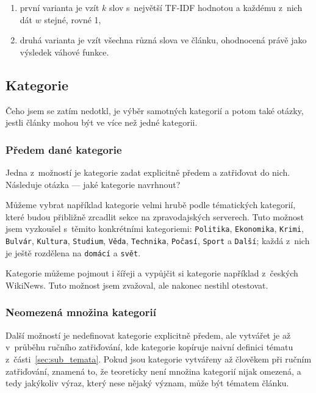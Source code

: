 \documentclass[12pt,a4paper]{report}
\begin{document}
\begin{enumerate}
    \item první varianta je vzít $k$ slov s~největší TF-IDF hodnotou a každému z~nich dát $w$ stejné, rovné 1,
    \item druhá varianta je vzít všechna různá slova ve článku, ohodnocená právě jako výsledek váhové funkce.
\end{enumerate}

\subsection{Kategorie}
\label{sec:jakekategorie}
Čeho jsem se zatím nedotkl, je výběr samotných kategorií a potom také otázky, jestli články mohou být ve více než jedné kategorii. %

\subsubsection{Předem dané kategorie}
\label{sec:omezene_teorie}

Jedna z~možností je kategorie zadat explicitně předem a zatřiďovat do nich. Následuje otázka --- jaké kategorie navrhnout?

Můžeme vybrat například kategorie velmi hrubě podle tématických kategorií, které budou přibližně zrcadlit sekce na zpravodajských serverech. Tuto možnost jsem vyzkoušel s~těmito konkrétními kategoriemi: \texttt{Politika}, \texttt{Ekonomika}, \texttt{Krimi}, \texttt{Bulvár}, \texttt{Kultura}, \texttt{Studium}, \texttt{Věda}, \texttt{Technika}, \texttt{Počasí}, \texttt{Sport} a \texttt{Další}; každá z~nich je ještě rozdělena na \texttt{domácí} a \texttt{svět}. 

Kategorie můžeme pojmout i šířeji a vypůjčit si kategorie například z~českých WikiNews. Tuto možnost jsem zvažoval, ale nakonec nestihl otestovat.


\subsubsection{Neomezená množina kategorií}
\label{sec:neomezene_teorie}

Další možností je nedefinovat kategorie explicitně předem, ale vytvářet je až v~průběhu ručního zatřiďování, kde  kategorie kopíruje naivní definici tématu z~čá\-sti~\ref{sec:sub_temata}. Pokud jsou kategorie vytvářeny až člověkem při ručním zatřiďování, znamená to, že teoreticky není množina kategorií nijak omezená, a tedy jakýkoliv výraz, který nese nějaký význam, může být tématem článku.
\end{document}
